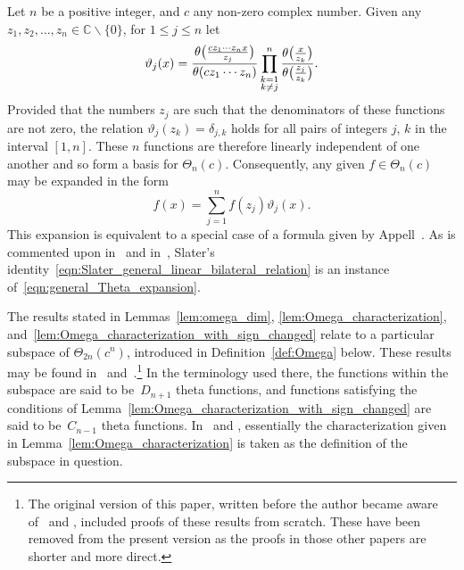 \documentclass[pdftex]{sigma}
\numberwithin{equation}{section}
\newcommand{\C}{\mathbb{C}}
\begin{document}
\begin{Remark} \label{rmk:Slater_general_linear_bilateral_relation}
Let $n$ be a positive integer, and $c$ any non-zero complex number. Given any $z_1,z_2,\dots,z_n \in \C \backslash\{0\}$, for $1 \leq j \leq n$ let
\[ \vartheta_j(x) = {\theta\bigl({cz_1 \cdots z_n x \over z_j}\bigr) \over \theta(cz_1\cdots z_n)} \prod_{\substack{k=1 \\ k \neq j}}^n {\theta\bigl({x \over z_k}\bigr) \over \theta\bigl({z_j \over z_k}\bigr)}. \]
Provided that the numbers $z_j$ are such that the denominators of these functions are not zero, the relation $\vartheta_j(z_k)=\delta_{j,k}$ holds for all pairs of integers $j$, $k$ in the interval $[1,n]$. These $n$ functions are therefore linearly independent of one another and so form a basis for $\Theta_n(c)$. Consequently, any given $f \in \Theta_n(c)$ may be expanded in the form
\begin{equation} \label{eqn:general_Theta_expansion}
f(x) = \sum_{j=1}^n f(z_j) \vartheta_j(x).
\end{equation}
This expansion is equivalent to a special case of a formula given by Appell~\cite[equations~(8) and~($8'$)]{Appell1884}. As is commented upon in~\cite[p.~88]{Bradley-Thrush2023} and in~\cite[Section~5.1]{Ito2008}, Slater's identity~\eqref{eqn:Slater_general_linear_bilateral_relation} is an instance of~\eqref{eqn:general_Theta_expansion}.
\end{Remark}

The results stated in Lemmas~\ref{lem:omega_dim}, \ref{lem:Omega_characterization}, and~\ref{lem:Omega_characterization_with_sign_changed} relate to a particular subspace of $\Theta_{2n}(c^n)$, introduced in Definition~\ref{def:Omega} below. These results may be found in~\cite[Lemma~4.3]{Ito2008} and~\cite[Lemma~3.2]{Rosengren2006}.\footnote{The original version of this paper, written before the author became aware of~\cite{Ito2008} and \cite{Rosengren2006}, included proofs of these results from scratch. These have been removed from the present version as the proofs in those other papers are shorter and more direct.} In the terminology used there, the functions within the subspace are said to be~$D_{n+1}$ theta functions, and functions satisfying the conditions of Lemma~\ref{lem:Omega_characterization_with_sign_changed} are said to be~$C_{n-1}$ theta functions. In~\cite{Ito2008} and \cite{Rosengren2006}, essentially the characterization given in Lemma~\ref{lem:Omega_characterization} is taken as the definition of the subspace in question.
\end{document}

